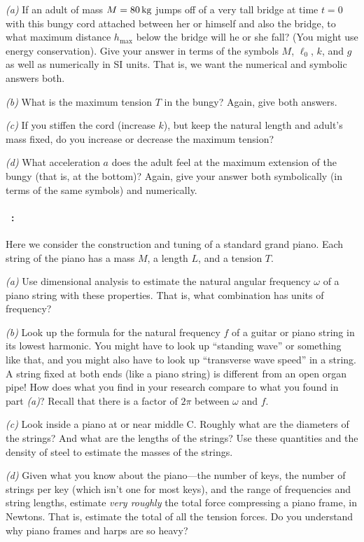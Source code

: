 \documentclass[12pt]{article}
\begin{document}
\textsl{(a)} If an adult of mass $M=80\,\mathrm{kg}$ jumps off of a very tall
bridge at time $t=0$ with this bungy cord attached between her or
himself and also the bridge, to what maximum distance $h_\mathrm{max}$
below the bridge will he or she fall?  (You might use energy
conservation). Give your answer in terms of the symbols $M$, $\ell_0$,
$k$, and $g$ as well as numerically in SI units. That is, we want the numerical
and symbolic answers both.

\textsl{(b)} What is the maximum tension $T$ in the bungy? Again, give
both answers.

\textsl{(c)} If you stiffen the cord (increase $k$), but keep
the natural length and adult's mass fixed, do you increase or decrease the maximum
tension?

\textsl{(d)} What acceleration $a$ does the adult feel at the maximum
extension of the bungy (that is, at the bottom)? Again, give your
answer both symbolically (in terms of the same symbols) and numerically.

\paragraph{\problemname~\theproblem:}%
Here we consider the construction and tuning of a standard grand piano.
Each string of the piano has a mass $M$, a length $L$, and a tension $T$.

\textsl{(a)} Use dimensional analysis to estimate the natural angular
frequency $\omega$ of a piano string with these properties. That is,
what combination has units of frequency?

\textsl{(b)} Look up the formula for the natural frequency $f$ of a guitar or piano string
in its lowest harmonic. You might have to look up ``standing wave'' or
something like that, and you might also have to look up ``transverse
wave speed'' in a string. A string fixed at both ends (like a piano
string) is different from an open organ pipe! How does what you find
in your research compare to what you found in part \textsl{(a)}?
Recall that there is a factor of $2\pi$ between $\omega$ and $f$.

\textsl{(c)} Look inside a piano at or near middle C. Roughly what are
the diameters of the strings? And what are the lengths of the strings?
Use these quantities and the density of steel to estimate the masses
of the strings.

\textsl{(d)} Given what you know about the piano---the number of keys,
the number of strings per key (which isn't one for most keys), and the
range of frequencies and string lengths, estimate \emph{very roughly}
the total force compressing a piano frame, in Newtons. That is,
estimate the total of all the tension forces. Do you understand why
piano frames and harps are so heavy?
\end{document}
